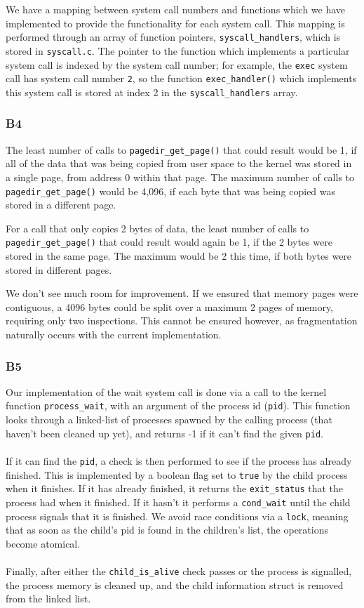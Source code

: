\documentclass[a4wide, 11pt]{article}
\newcommand{\tx}{\texttt}
\begin{document}
We have a mapping between system call numbers and functions which we have implemented to provide the functionality for each system call. This mapping is performed through an array of function pointers, \tx{syscall\_handlers}, which is stored in \tx{syscall.c}. The pointer to the function which implements a particular system call is indexed by the system call number; for example, the \tx{exec} system call has system call number \tx{2}, so the function \tx{exec\_handler()} which implements this system call is stored at index 2 in the \tx{syscall\_handlers} array.

\subsubsection{B4}

The least number of calls to \tx{pagedir\_get\_page()} that could result would be 1, if all of the data that was being copied from user space to the kernel was stored in a single page, from address 0 within that page. The maximum number of calls to \tx{pagedir\_get\_page()} would be 4,096, if each byte that was being copied was stored in a different page.

For a call that only copies 2 bytes of data, the least number of calls to \tx{pagedir\_get\_page()} that could result would again be 1, if the 2 bytes were stored in the same page. The maximum would be 2 this time, if both bytes were stored in different pages.

We don't see much room for improvement. If we ensured that memory pages were contiguous, a 4096 bytes could be split over a maximum 2 pages of memory, requiring only two inspections. This cannot be ensured however, as fragmentation naturally occurs with the current implementation.

\subsubsection{B5}

Our implementation of the wait system call is done via a call to the kernel function \texttt{process\_wait}, with an argument of the process id (\texttt{pid}). This function looks through a linked-list of processes spawned by the calling process (that haven't been cleaned up yet), and returns -1 if it can't find the given \texttt{pid}.
\\\\
If it can find the \texttt{pid}, a check is then performed to see if the process has already finished. This is implemented by a boolean flag set to \texttt{true} by the child process when it finishes. If it has already finished, it returns the \texttt{exit\_status} that the process had when it finished. If it hasn't it performs a \texttt{cond\_wait} until the child process signals that it is finished. We avoid race conditions via a \texttt{lock}, meaning that as soon as the child's pid is found in the children's list, the operations become atomical.
\\\\
Finally, after either the \texttt{child\_is\_alive} check passes or the process is signalled, the process memory is cleaned up, and the child information struct is removed from the linked list.
\end{document}
